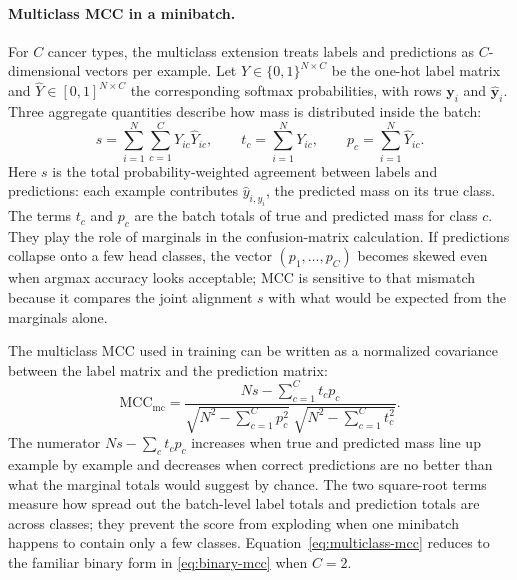\documentclass[11pt]{article}
\begin{document}
\paragraph{Multiclass MCC in a minibatch.}
For $C$ cancer types, the multiclass extension treats labels and predictions as $C$-dimensional vectors per example. Let $Y\in\{0,1\}^{N\times C}$ be the one-hot label matrix and $\widehat{Y}\in[0,1]^{N\times C}$ the corresponding softmax probabilities, with rows $\mathbf{y}_i$ and $\hat{\mathbf{y}}_i$. Three aggregate quantities describe how mass is distributed inside the batch:
\begin{equation}
  s = \sum_{i=1}^{N}\sum_{c=1}^{C} Y_{ic}\widehat{Y}_{ic},
  \qquad
  t_c = \sum_{i=1}^{N} Y_{ic},
  \qquad
  p_c = \sum_{i=1}^{N} \widehat{Y}_{ic}.
  \label{eq:mcc-components}
\end{equation}
\noindent Here $s$ is the total probability-weighted agreement between labels and predictions: each example contributes $\hat{y}_{i,y_i}$, the predicted mass on its true class. The terms $t_c$ and $p_c$ are the batch totals of true and predicted mass for class $c$. They play the role of marginals in the confusion-matrix calculation. If predictions collapse onto a few head classes, the vector $(p_1,\ldots,p_C)$ becomes skewed even when argmax accuracy looks acceptable; MCC is sensitive to that mismatch because it compares the joint alignment $s$ with what would be expected from the marginals alone.

The multiclass MCC used in training can be written as a normalized covariance between the label matrix and the prediction matrix:
\begin{equation}
  \mathrm{MCC}_{\mathrm{mc}} =
  \frac{Ns - \sum_{c=1}^{C} t_c p_c}
       {\sqrt{N^2 - \sum_{c=1}^{C} p_c^2}\;
        \sqrt{N^2 - \sum_{c=1}^{C} t_c^2}}.
  \label{eq:multiclass-mcc}
\end{equation}
\noindent The numerator $Ns-\sum_c t_c p_c$ increases when true and predicted mass line up example by example and decreases when correct predictions are no better than what the marginal totals would suggest by chance. The two square-root terms measure how spread out the batch-level label totals and prediction totals are across classes; they prevent the score from exploding when one minibatch happens to contain only a few classes. Equation~\eqref{eq:multiclass-mcc} reduces to the familiar binary form in \eqref{eq:binary-mcc} when $C=2$.
\end{document}
